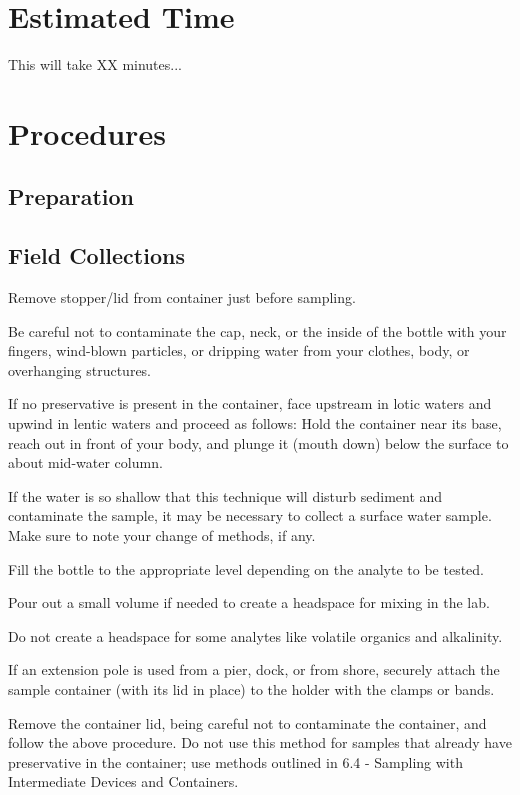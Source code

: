 \documentclass[12pt]{../SOP4_alpha}\usepackage[]{graphicx}\usepackage[]{xcolor}
\begin{document}
\section{Estimated Time}

\NP This will take XX minutes...


\section{Procedures}

\subsection{Preparation}




\subsection{Field Collections}

\NP Remove stopper/lid from container just before sampling. 

\NP Be careful not to contaminate the cap, neck, or the inside of the bottle with your fingers, wind-blown particles, or dripping water from your clothes, body, or overhanging structures.  

\NP If no preservative is present in the container, face upstream in lotic waters and upwind in lentic waters and proceed as follows:  Hold the container near its base, reach out in front of your body, and plunge it (mouth down) below the surface to about mid-water column. 

\NP If the water is so shallow that this technique will disturb sediment and contaminate the sample, it may be necessary to collect a surface water sample. Make sure to note your change of methods, if any.  

\NP Fill the bottle to the appropriate level depending on the analyte to be tested.  

\NP Pour out a small volume if needed to create a headspace for mixing in the lab. 

\NP Do not create a headspace for some analytes like volatile organics and alkalinity.  

\NP If an extension pole is used from a pier, dock, or from shore, securely attach the sample container (with its lid in place) to the holder with the clamps or bands. 

\NP Remove the container lid, being careful not to contaminate the container, and follow the above procedure. Do not use this method for samples that already have preservative in the container; use methods outlined in 6.4 - Sampling with Intermediate Devices and Containers.  
\end{document}

